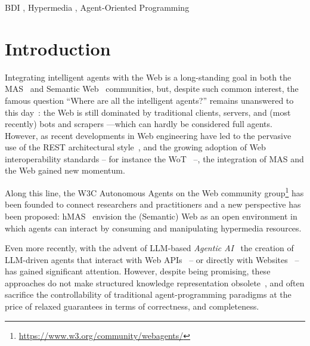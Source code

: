 \documentclass[
]{ceurart}
\begin{document}
\begin{keywords}
  BDI  \sep
  Hypermedia \sep
  Agent-Oriented Programming
\end{keywords}

\maketitle

\section{Introduction}

Integrating intelligent agents with the Web is a long-standing goal
in both the \ac{MAS}~\cite{DBLP:conf/edoc/ShafiqDF06}
and Semantic Web~\cite{lassila2001semantic} communities, but,
despite such common interest,
the famous question
``Where are all the intelligent agents?''
remains unanswered to this day~\cite{hendlerb2007expert}:
the Web is still dominated by traditional clients, servers,
and (most recently) bots and scrapers%
---which can hardly be considered full agents.
%
However,
as recent developments in Web engineering have led to
the pervasive use of the \ac{REST} architectural style~\cite{DBLP:journals/toit/FieldingT02},
and the growing adoption of Web interoperability standards %
-- for instance the \ac{WoT}~\cite{wotarch} --,
the integration of \ac{MAS} and the Web gained new momentum.

Along this line,
the \ac{W3C} Autonomous Agents on the Web community group\footnote{\url{https://www.w3.org/community/webagents/}}
has been founded to connect researchers and practitioners
and a new perspective has been proposed: \ac{hMAS}~\cite{DBLP:conf/atal/CiorteaMGBRZ19}
envision the (Semantic) Web as an open environment in which
agents can interact by consuming and manipulating hypermedia resources.

Even more recently,
with the advent of \ac{LLM}-based \emph{Agentic AI}~\cite{acharya2025access}
the creation of \ac{LLM}-driven agents that interact with Web APIs~\cite{10.5555/3692070.3692540}
-- or directly with Websites~\cite{10.5555/3692070.3694608} --
has gained significant attention.
%
However,
despite being promising,
these approaches
do not make structured knowledge representation obsolete~\cite{pan2024tkde},
and often sacrifice the controllability of traditional agent-programming paradigms
at the price of relaxed guarantees in terms of correctness, and completeness.
\end{document}
